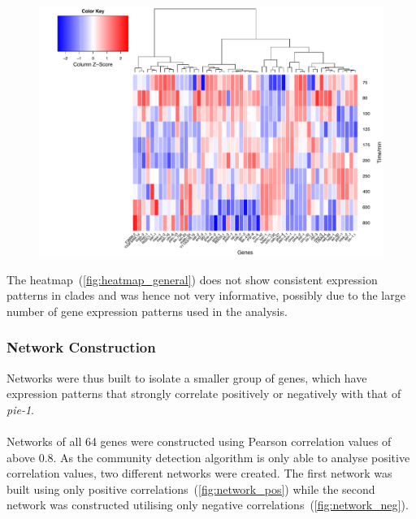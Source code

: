 \documentclass[11pt]{article}
\begin{document}
\begin{figure}[H]
  \centering
    \includegraphics[width=\textwidth]{heatmap_general.pdf}
  \label{fig:heatmap_general}
\end{figure}

The heatmap~(\autoref{fig:heatmap_general}) does not show consistent expression patterns in clades and was hence not very informative, possibly due to the large number of gene expression patterns used in the analysis.

\subsubsection{Network Construction}
Networks were thus built to isolate a smaller group of genes, which have expression patterns that strongly correlate positively or negatively with that of \textit{pie-1}.
\\
\\
Networks of all 64 genes were constructed using Pearson correlation values of above 0.8. As the community detection algorithm is only able to analyse positive correlation values, two different networks were created. The first network was built using only positive correlations~(\autoref{fig:network_pos}) while the second network was constructed utilising only negative correlations~(\autoref{fig:network_neg}).
\end{document}
